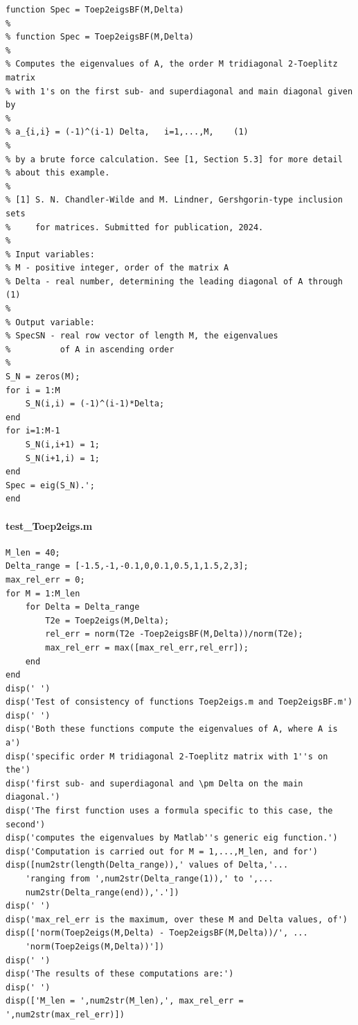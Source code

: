 \documentclass[preprint,1p,11pt]{elsarticle}
\numberwithin{equation}{section}   %
\numberwithin{figure}{section}  %
\begin{document}
\begin{verbatim}
function Spec = Toep2eigsBF(M,Delta)
%
% function Spec = Toep2eigsBF(M,Delta)
%
% Computes the eigenvalues of A, the order M tridiagonal 2-Toeplitz matrix
% with 1's on the first sub- and superdiagonal and main diagonal given by
% 
% a_{i,i} = (-1)^(i-1) Delta,   i=1,...,M,    (1)
% 
% by a brute force calculation. See [1, Section 5.3] for more detail
% about this example.
%
% [1] S. N. Chandler-Wilde and M. Lindner, Gershgorin-type inclusion sets
%     for matrices. Submitted for publication, 2024.
%
% Input variables:
% M - positive integer, order of the matrix A
% Delta - real number, determining the leading diagonal of A through (1)
%
% Output variable:
% SpecSN - real row vector of length M, the eigenvalues 
%          of A in ascending order 
%
S_N = zeros(M);
for i = 1:M
    S_N(i,i) = (-1)^(i-1)*Delta;
end
for i=1:M-1
    S_N(i,i+1) = 1;
    S_N(i+1,i) = 1;
end
Spec = eig(S_N).';
end
\end{verbatim}

\paragraph{test\_Toep2eigs.m}
\begin{verbatim}
M_len = 40;
Delta_range = [-1.5,-1,-0.1,0,0.1,0.5,1,1.5,2,3];
max_rel_err = 0;
for M = 1:M_len
    for Delta = Delta_range
        T2e = Toep2eigs(M,Delta);
        rel_err = norm(T2e -Toep2eigsBF(M,Delta))/norm(T2e);
        max_rel_err = max([max_rel_err,rel_err]);
    end
end
disp(' ')
disp('Test of consistency of functions Toep2eigs.m and Toep2eigsBF.m')
disp(' ')
disp('Both these functions compute the eigenvalues of A, where A is a')
disp('specific order M tridiagonal 2-Toeplitz matrix with 1''s on the') 
disp('first sub- and superdiagonal and \pm Delta on the main diagonal.')
disp('The first function uses a formula specific to this case, the second')
disp('computes the eigenvalues by Matlab''s generic eig function.')
disp('Computation is carried out for M = 1,...,M_len, and for')
disp([num2str(length(Delta_range)),' values of Delta,'...
    'ranging from ',num2str(Delta_range(1)),' to ',...
    num2str(Delta_range(end)),'.'])
disp(' ')
disp('max_rel_err is the maximum, over these M and Delta values, of')
disp(['norm(Toep2eigs(M,Delta) - Toep2eigsBF(M,Delta))/', ...
    'norm(Toep2eigs(M,Delta))'])
disp(' ')
disp('The results of these computations are:')
disp(' ')
disp(['M_len = ',num2str(M_len),', max_rel_err = ',num2str(max_rel_err)])
\end{verbatim}
\end{document}
